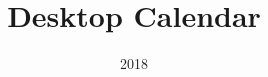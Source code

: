 \documentclass[table]{beamer}
\title[Sujit]{{\color{mymaroon} \setlength{\fboxrule}{2pt} \fbox{\texttt{[image: images/0.jpg]}}} \\ Desktop Calendar \\ \vspace*{-2cm}}
\author{}
\institute{}
\date{\Huge{2018}}
\begin{document}
\beamertemplatenavigationsymbolsempty
\maketitle

\newcommand{\highlight}[1]{{\color{Red}(#1)}}
\newcommand{\comment}[1]{\begin{tiny}
{\color{blue}(#1)}
\end{tiny}}
\newcommand{\myheader}[1]{
	{\color{mymaroon}
		\begin{Large}
			\begin{center}
				{#1}
			\end{center}
		\end{Large}
	}
}

\newcommand{\myminorheader}[1]{
	{\color{purple}
		\begin{large}
			{#1}
		\end{large}
	}
}

\newcommand{\monthcolour}{myindigo}
\newcommand{\headercolour}{yellow!25}
\newcommand{\phbordercolour}{mymaroon}
\newcommand{\workingdaycolour}{black}
\newcommand{\holidaycolour}{red}
\newcommand{\weekendcolour}{mymaroon}

\fboxsep=2pt%
\fboxrule=2pt%

\end{document}
